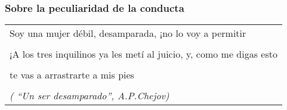 \protect\hypertarget{M21}{}{}

\hypertarget{sobre-la-peculiaridad-de-la-conducta}{\subsubsection{Sobre
la peculiaridad de la
conducta}\label{sobre-la-peculiaridad-de-la-conducta}}

\begin{longtable}[]{@{}l@{}}
\toprule
Soy una mujer débil, desamparada, ¡no lo voy a permitir\tabularnewline
\tabularnewline
¡A los tres inquilinos ya les metí al juicio, y, como me digas
esto\tabularnewline
\tabularnewline
te vas a arrastrarte a mis pies\tabularnewline
\tabularnewline
\emph{( ``Un ser desamparado'', A.P.Chejov)}\tabularnewline
\bottomrule
\end{longtable}

